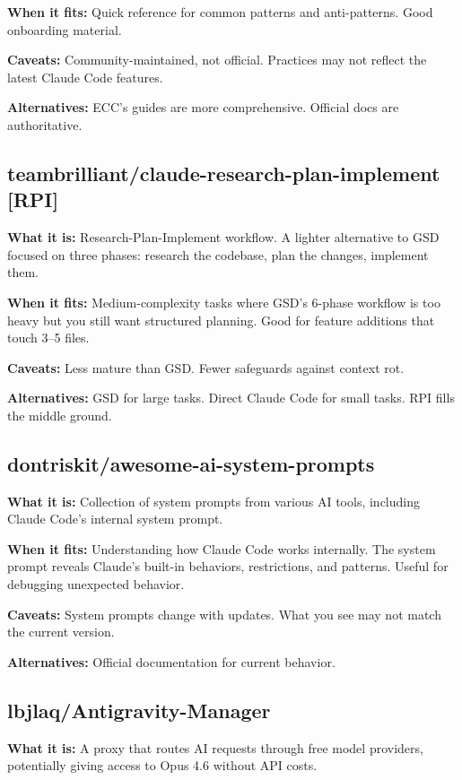 \documentclass[11pt,a4paper]{article}
\begin{document}
\textbf{When it fits:} Quick reference for common patterns and anti-patterns. Good onboarding material.

\textbf{Caveats:} Community-maintained, not official. Practices may not reflect the latest Claude Code features.

\textbf{Alternatives:} ECC's guides are more comprehensive. Official docs are authoritative.

\subsection{teambrilliant/claude-research-plan-implement [RPI]}

\textbf{What it is:} Research-Plan-Implement workflow. A lighter alternative to GSD focused on three phases: research the codebase, plan the changes, implement them.

\textbf{When it fits:} Medium-complexity tasks where GSD's 6-phase workflow is too heavy but you still want structured planning. Good for feature additions that touch 3--5 files.

\textbf{Caveats:} Less mature than GSD. Fewer safeguards against context rot.

\textbf{Alternatives:} GSD for large tasks. Direct Claude Code for small tasks. RPI fills the middle ground.

\subsection{dontriskit/awesome-ai-system-prompts}

\textbf{What it is:} Collection of system prompts from various AI tools, including Claude Code's internal system prompt.

\textbf{When it fits:} Understanding how Claude Code works internally. The system prompt reveals Claude's built-in behaviors, restrictions, and patterns. Useful for debugging unexpected behavior.

\textbf{Caveats:} System prompts change with updates. What you see may not match the current version.

\textbf{Alternatives:} Official documentation for current behavior.

\subsection{lbjlaq/Antigravity-Manager}

\textbf{What it is:} A proxy that routes AI requests through free model providers, potentially giving access to Opus 4.6 without API costs.
\end{document}
